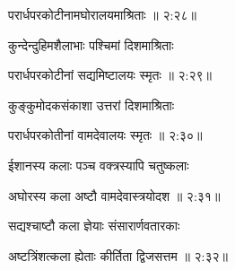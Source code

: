 
{\devanagarifont परार्धपरकोटीनामघोरालयमाश्रिताः {॥ २:२८॥} \veg\dontdisplaylinenum }%

{\devanagarifont कुन्देन्दुहिमशैलाभाः पश्चिमां दिशमाश्रिताः \thinspace{\dandab} \dontdisplaylinenum }%


{\devanagarifont परार्धपरकोटीनां सद्यमिष्टालयः स्मृतः {॥ २:२९॥} \veg\dontdisplaylinenum }%

{\devanagarifont कुङ्कुमोदकसंकाशा उत्तरां दिशमाश्रिताः \thinspace{\dandab} \dontdisplaylinenum }%


{\devanagarifont परार्धपरकोतीनां वामदेवालयः स्मृतः {॥ २:३०॥} \veg\dontdisplaylinenum }%

{\devanagarifont ईशानस्य कलाः पञ्च वक्त्रस्यापि चतुष्कलाः \thinspace{\dandab} \dontdisplaylinenum }%


{\devanagarifont अघोरस्य कला अष्टौ वामदेवास्त्रयोदश {॥ २:३१॥} \veg\dontdisplaylinenum }%

{\devanagarifont सद्यश्चाष्टौ कला ज्ञेयाः संसारार्णवतारकाः \thinspace{\dandab} \dontdisplaylinenum }%


{\devanagarifont अष्टत्रिंशत्कला ह्येताः कीर्तिता द्विजसत्तम {॥ २:३२॥} \veg\dontdisplaylinenum }%


